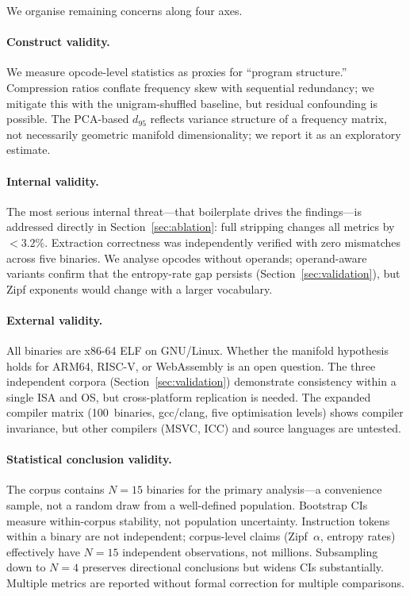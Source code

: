 \documentclass[10pt,twocolumn]{article}
\begin{document}
We organise remaining concerns along four axes.

\paragraph{Construct validity.}
We measure opcode-level statistics as proxies for ``program structure.''
Compression ratios conflate frequency skew with sequential redundancy;
we mitigate this with the unigram-shuffled baseline, but residual
confounding is possible.  The PCA-based $d_{95}$ reflects variance
structure of a frequency matrix, not necessarily geometric manifold
dimensionality; we report it as an exploratory estimate.

\paragraph{Internal validity.}
The most serious internal threat---that boilerplate drives the
findings---is addressed directly in Section~\ref{sec:ablation}: full
stripping changes all metrics by $<3.2\%$.  Extraction correctness was
independently verified with zero mismatches across five binaries.
We analyse opcodes without operands; operand-aware variants confirm that
the entropy-rate gap persists (Section~\ref{sec:validation}), but Zipf
exponents would change with a larger vocabulary.

\paragraph{External validity.}
All binaries are x86-64 ELF on GNU/Linux.  Whether the manifold
hypothesis holds for ARM64, RISC-V, or WebAssembly is an open question.
The three independent corpora (Section~\ref{sec:validation}) demonstrate
consistency within a single ISA and OS, but cross-platform replication
is needed.  The expanded compiler matrix (100~binaries, gcc/clang,
five optimisation levels) shows compiler invariance, but other compilers
(MSVC, ICC) and source languages are untested.

\paragraph{Statistical conclusion validity.}
The corpus contains $N = 15$ binaries for the primary analysis---a
convenience sample, not a random draw from a well-defined population.
Bootstrap CIs measure within-corpus stability, not population uncertainty.
Instruction tokens within a binary are not independent; corpus-level
claims (Zipf~$\alpha$, entropy rates) effectively have $N = 15$
independent observations, not millions.  Subsampling down to $N = 4$
preserves directional conclusions but widens CIs substantially.  Multiple
metrics are reported without formal correction for multiple comparisons.
\end{document}
